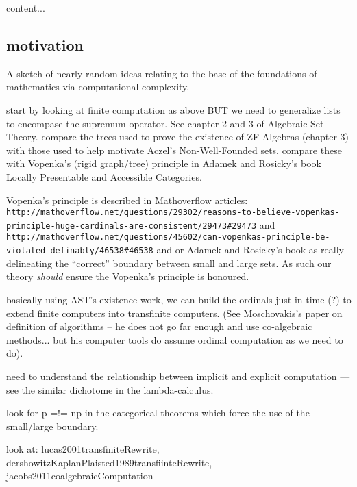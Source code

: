 \documentclass[a4paper,openany]{amsbook}
\begin{document}
\begin{definition}
content...
\end{definition}

\subsection{motivation}

A sketch of nearly random ideas relating to the base of the foundations of
mathematics via computational complexity.

start by looking at finite computation as above BUT we need to generalize lists
to encompase the supremum operator. See chapter 2 and 3 of Algebraic Set Theory.
compare the trees used to prove the existence of ZF-Algebras (chapter 3) with
those used to help motivate Aczel's Non-Well-Founded sets. compare these with
Vopenka's (rigid graph/tree) principle in Adamek and Rosicky's book Locally
Presentable and Accessible Categories.

Vopenka's principle is described in Mathoverflow articles:
\verb|http://mathoverflow.net/questions/29302/reasons-to-believe-vopenkas-principle-huge-cardinals-are-consistent/29473#29473|
and
\verb|http://mathoverflow.net/questions/45602/can-vopenkas-principle-be-violated-definably/46538#46538|
and or Adamek and Rosicky's book as really delineating the ``correct'' boundary
between small and large sets. As such our theory \emph{should} ensure the
Vopenka's principle is honoured.

basically using AST's existence work, we can build the ordinals just in time (?)
to extend finite computers into transfinite computers. (See Moschovakis's paper
on definition of algorithms -- he does not go far enough and use co-algebraic
methods... but his computer tools do assume ordinal computation as we need to
do).

need to understand the relationship between implicit and explicit computation
--- see the similar dichotome in the lambda-calculus.

look for p =!= np in the categorical theorems which force the use of the
small/large boundary.

look at: lucas2001transfiniteRewrite,
dershowitzKaplanPlaisted1989transfiinteRewrite,
jacobs2011coalgebraicComputation



\end{document}
